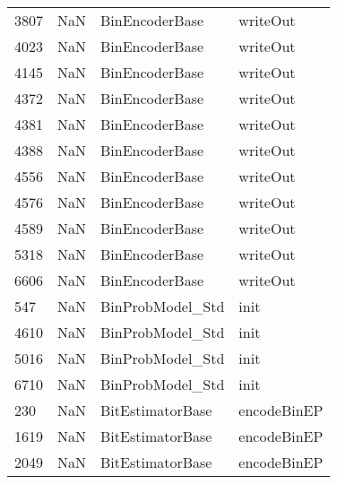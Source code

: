 \begin{tabular}{llll}
3807 &                   NaN &             BinEncoderBase &                                  writeOut \\
4023 &                   NaN &             BinEncoderBase &                                  writeOut \\
4145 &                   NaN &             BinEncoderBase &                                  writeOut \\
4372 &                   NaN &             BinEncoderBase &                                  writeOut \\
4381 &                   NaN &             BinEncoderBase &                                  writeOut \\
4388 &                   NaN &             BinEncoderBase &                                  writeOut \\
4556 &                   NaN &             BinEncoderBase &                                  writeOut \\
4576 &                   NaN &             BinEncoderBase &                                  writeOut \\
4589 &                   NaN &             BinEncoderBase &                                  writeOut \\
5318 &                   NaN &             BinEncoderBase &                                  writeOut \\
6606 &                   NaN &             BinEncoderBase &                                  writeOut \\
547  &                   NaN &           BinProbModel\_Std &                                      init \\
4610 &                   NaN &           BinProbModel\_Std &                                      init \\
5016 &                   NaN &           BinProbModel\_Std &                                      init \\
6710 &                   NaN &           BinProbModel\_Std &                                      init \\
230  &                   NaN &           BitEstimatorBase &                               encodeBinEP \\
1619 &                   NaN &           BitEstimatorBase &                               encodeBinEP \\
2049 &                   NaN &           BitEstimatorBase &                               encodeBinEP \\

\end{tabular}
